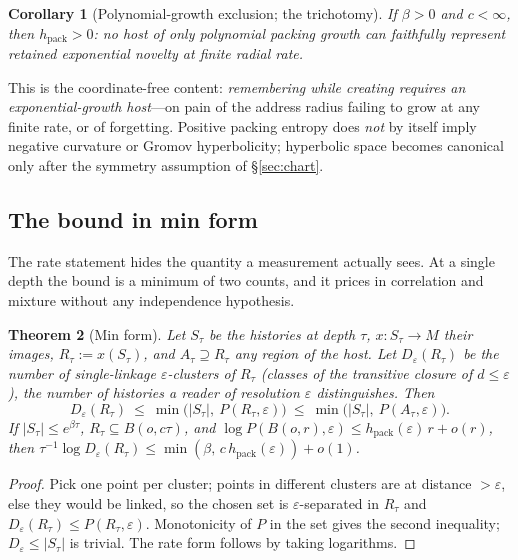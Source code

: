 \documentclass[11pt,reqno]{amsart}
\theoremstyle{plain}
\newtheorem{theorem}{Theorem}[section]
\newtheorem{corollary}[theorem]{Corollary}
\theoremstyle{definition}
\newcommand{\hpack}{h_{\mathrm{pack}}}
\newcommand{\eps}{\varepsilon}
\begin{document}
\begin{corollary}[Polynomial-growth exclusion; the trichotomy]\label{cor:poly}
If $\beta>0$ and $c<\infty$, then $\hpack>0$: no host of only polynomial packing growth can faithfully represent retained exponential novelty at finite radial rate.
\end{corollary}

This is the coordinate-free content: \emph{remembering while creating requires an exponential-growth host}---on pain of the address radius failing to grow at any finite rate, or of forgetting. Positive packing entropy does \emph{not} by itself imply negative curvature or Gromov hyperbolicity; hyperbolic space becomes canonical only after the symmetry assumption of \S\ref{sec:chart}.

\subsection{The bound in min form}\label{sec:minform}

The rate statement hides the quantity a measurement actually sees. At a single depth the bound is a minimum of two counts, and it prices in correlation and mixture without any independence hypothesis.

\begin{theorem}[Min form]\label{thm:minform}
Let $S_\tau$ be the histories at depth $\tau$, $x:S_\tau\to M$ their images, $R_\tau:=x(S_\tau)$, and $A_\tau\supseteq R_\tau$ any region of the host. Let $D_\eps(R_\tau)$ be the number of single-linkage $\eps$-clusters of $R_\tau$ (classes of the transitive closure of $d\le\eps$), the number of histories a reader of resolution $\eps$ distinguishes. Then
\[
D_\eps(R_\tau)\ \le\ \min\big(|S_\tau|,\ P(R_\tau,\eps)\big)\ \le\ \min\big(|S_\tau|,\ P(A_\tau,\eps)\big).
\]
If $|S_\tau|\le e^{\beta\tau}$, $R_\tau\subseteq B(o,c\tau)$, and $\log P(B(o,r),\eps)\le\hpack(\eps)\,r+o(r)$, then $\tau^{-1}\log D_\eps(R_\tau)\le\min(\beta,\,c\,\hpack(\eps))+o(1)$.
\end{theorem}

\begin{proof}
Pick one point per cluster; points in different clusters are at distance $>\eps$, else they would be linked, so the chosen set is $\eps$-separated in $R_\tau$ and $D_\eps(R_\tau)\le P(R_\tau,\eps)$. Monotonicity of $P$ in the set gives the second inequality; $D_\eps\le|S_\tau|$ is trivial. The rate form follows by taking logarithms.
\end{proof}
\end{document}
